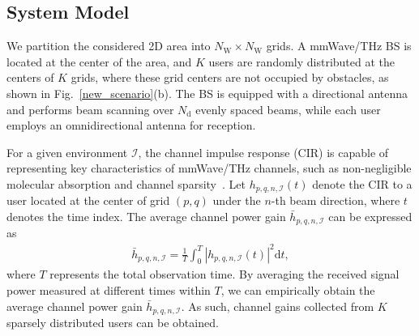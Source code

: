 \documentclass[journal,12pt,onecolumn,draftclsnofoot]{IEEEtran}
\newcommand\IC{\ensuremath{\mathcal{I}}}
\newcommand\WR{\ensuremath{\mathrm{W}}}
\newcommand\dR{\ensuremath{\mathrm{d}}}
\newcommand\rx{\ensuremath{\mathrm{rx}}}
\newcommand\tx{\ensuremath{\mathrm{tx}}}
\begin{document}
\subsection{System Model}

We partition the considered 2D area into $N_{\WR} \times N_{\WR}$ grids. A mmWave/THz BS is located at the center of the area, and $K$ users are randomly distributed at the centers of $K$ grids, where these grid centers are not occupied by obstacles, as shown in Fig.~\ref{new_scenario}(b). The BS is equipped with a directional antenna and performs beam scanning over $N_{\dR}$ evenly spaced beams, while each user employs an omnidirectional antenna for reception. 



For a given environment $\IC$, the channel impulse response (CIR) is capable of representing key characteristics of mmWave/THz channels, such as non-negligible molecular absorption and channel sparsity~\cite{ning2023beamforming}. Let $h_{p,q,n,\IC}(t)$ denote the CIR to a user located at the center of grid $(p,q)$ under the $n$-th beam direction, where $t$ denotes the time index. The average channel power gain $\bar{h}_{p,q,n,\IC}$ can be expressed as 
\begin{align}
\bar{h}_{p,q,n,\IC}=\frac{1}{T} \int_{0}^{T} |h_{p,q,n,\IC}(t)|^{2} \dR t,		
\label{Model_2}
\end{align}where $T$ represents the total observation time. By averaging the received signal power measured at different times within $T$, we can empirically obtain the average channel power gain $\bar{h}_{p,q,n,\IC}$. As such, channel gains collected from $K$ sparsely distributed users can be obtained. 
\end{document}
